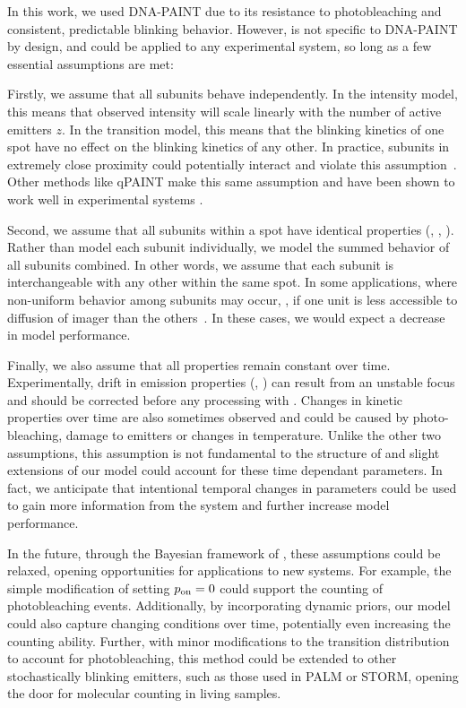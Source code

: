 In this work, we used DNA-PAINT due to its resistance to photobleaching and consistent, 
predictable blinking behavior.
  However, \ours is not specific to DNA-PAINT by design, and could be 
  applied to any experimental system, so long as a few essential assumptions are met:

  Firstly, we assume that all subunits behave independently.
  In the intensity model, this means that observed intensity will scale
  linearly with the number of active emitters $z$.
  In the transition model, this means that the blinking kinetics of one spot
  have no effect on the blinking kinetics of any other.
  In practice, subunits in extremely close proximity could
  potentially interact and violate this assumption~\citep{helmerich_photoswitching_2022}. 
  Other methods like qPAINT make this same assumption and have been shown to
  work well in experimental systems \citep{fischer_quantitative_2021,
  jayasinghe_true_2018}. 

  Second, we assume that all subunits within a spot have identical properties
  (\pon, \poff, \re).
  Rather than model each subunit individually, we model the summed behavior
  of all subunits combined. 
  In other words, we assume that each subunit is
  interchangeable with any other within the same spot.
  In some applications, where non-uniform behavior among subunits may occur, \eg,
  if one unit is less accessible to diffusion of
  imager than the others~\citep{civitci_2020}. 
  In these cases, we would expect a decrease in model performance.

Finally, we also assume that all properties remain constant over time. 
  Experimentally, drift in emission properties (\re, \rb) can result from 
  an unstable focus and should be corrected before any processing with
  \ours.
  Changes in kinetic properties over time are also sometimes observed and could
  be caused by photo-bleaching, damage to emitters or changes in temperature. 
  Unlike the other two assumptions, this assumption is not fundamental to the
  structure of \ours and slight extensions of our model could account for these
  time dependant parameters.
  In fact, we anticipate that intentional temporal changes in parameters could be used to gain more
  information from the system and further increase model performance.


In the future, through the Bayesian framework of \ours, these assumptions could be relaxed, 
opening opportunities for applications to new systems.
    For example, the simple modification of setting $p_\text{on}=0$ could support the
    counting of photobleaching events.
    Additionally, by incorporating dynamic priors, our model could also capture
    changing conditions over time, potentially even increasing the counting
    ability.
    Further, with minor modifications to the transition distribution to account
    for photobleaching, this method could be extended to other stochastically
    blinking emitters, such as those used in PALM or STORM, opening the door
    for molecular counting in living samples.

